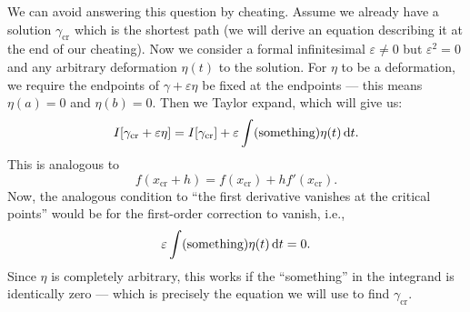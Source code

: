 We can avoid answering this question by cheating. Assume we already have
a solution $\gamma_{\text{cr}}$ which is the shortest path (we will
derive an equation describing it at the end of our cheating). Now we
consider a formal infinitesimal $\varepsilon\neq0$ but
$\varepsilon^{2}=0$ and any arbitrary deformation $\eta(t)$ to the
solution. For $\eta$ to be a deformation, we require the endpoints of
$\gamma+\varepsilon\eta$ be fixed at the endpoints --- this means
$\eta(a)=0$ and $\eta(b)=0$. Then we Taylor expand, which will give us:
\begin{equation}
I[\gamma_{\text{cr}}+\varepsilon\eta] =
I[\gamma_{\text{cr}}] + \varepsilon\int(\mbox{something})\eta(t)\,\mathrm{d} t.
\end{equation}
This is analogous to
\begin{equation}
f(x_{\text{cr}} + h) = f(x_{\text{cr}}) + hf'(x_{\text{cr}}).
\end{equation}
Now, the analogous condition to ``the first derivative vanishes at the
critical points'' would be for the first-order correction to vanish,
i.e.,
\begin{equation}
\varepsilon\int(\mbox{something})\eta(t)\,\mathrm{d} t = 0.
\end{equation}
Since $\eta$ is completely arbitrary, this works if the ``something'' in
the integrand is identically zero --- which is precisely the equation we
will use to find $\gamma_{\text{cr}}$.

